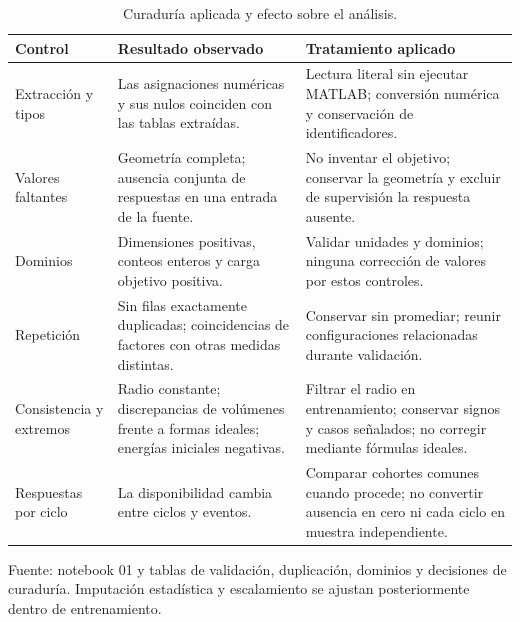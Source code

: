 \begin{table}[htbp]
\centering\small{}
\caption{Curaduría aplicada y efecto sobre el análisis.}
\label{tab:curaduria}
\begin{tabularx}{\linewidth}{@{}YYY@{}}
\toprule
Control & Resultado observado & Tratamiento aplicado \\
\midrule
Extracción y tipos & Las asignaciones numéricas y sus nulos coinciden con las tablas extraídas. & Lectura literal sin ejecutar MATLAB; conversión numérica y conservación de identificadores. \\
\addlinespace
Valores faltantes & Geometría completa; ausencia conjunta de respuestas en una entrada de la fuente. & No inventar el objetivo; conservar la geometría y excluir de supervisión la respuesta ausente. \\
\addlinespace
Dominios & Dimensiones positivas, conteos enteros y carga objetivo positiva. & Validar unidades y dominios; ninguna corrección de valores por estos controles. \\
\addlinespace
Repetición & Sin filas exactamente duplicadas; coincidencias de factores con otras medidas distintas. & Conservar sin promediar; reunir configuraciones relacionadas durante validación. \\
\addlinespace
Consistencia y extremos & Radio constante; discrepancias de volúmenes frente a formas ideales; energías iniciales negativas. & Filtrar el radio en entrenamiento; conservar signos y casos señalados; no corregir mediante fórmulas ideales. \\
\addlinespace
Respuestas por ciclo & La disponibilidad cambia entre ciclos y eventos. & Comparar cohortes comunes cuando procede; no convertir ausencia en cero ni cada ciclo en muestra independiente. \\
\bottomrule
\end{tabularx}
\par\smallskip\small Fuente: notebook 01 y tablas de validación, duplicación, dominios y decisiones de curaduría. Imputación estadística y escalamiento se ajustan posteriormente dentro de entrenamiento.
\end{table}
